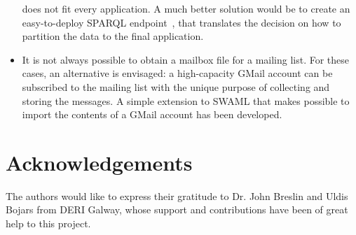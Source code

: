 \documentclass{llncs}
\begin{document}
\begin{itemize}
        does not fit every application. A much better solution would be to
        create an easy-to-deploy SPARQL endpoint~\cite{SPARQLProtocol},
        that translates the
        decision on how to partition the data to the final application.
  \item It is not always possible to obtain a mailbox file for a mailing
        list. For these cases, an alternative is envisaged: a high-capacity
        GMail account can be subscribed to the mailing list with the unique
        purpose of collecting and storing the messages. A simple extension
        to SWAML that makes possible to import the contents of a GMail
        account has been developed.

\end{itemize}

\section*{Acknowledgements}

The authors would like to express their gratitude to Dr. John Breslin and
Uldis Bojars from DERI Galway, whose support and contributions have been of 
great help to this project.



%
\end{document}
